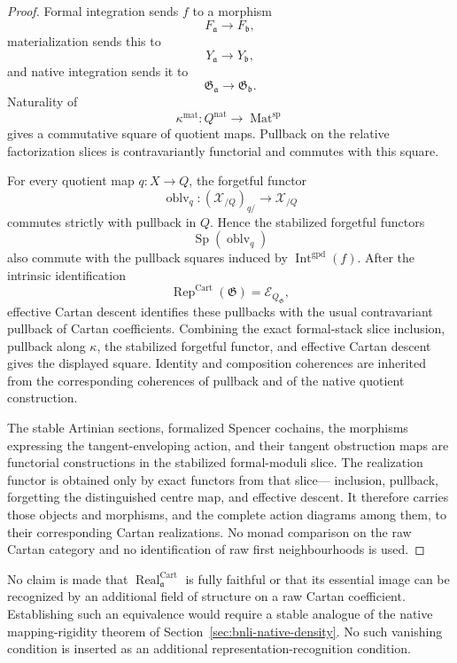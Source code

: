 \begin{proof}
Formal integration sends $f$ to a morphism
\[
    F_{\mathfrak a}\longrightarrow F_{\mathfrak b},
\]
materialization sends this to
\[
    Y_{\mathfrak a}\longrightarrow Y_{\mathfrak b},
\]
and native integration sends it to
\[
    \mathfrak G_{\mathfrak a}
    \longrightarrow
    \mathfrak G_{\mathfrak b}.
\]
Naturality of
\[
    \kappa^{\mathrm{mat}}:
    Q^{\mathrm{nat}}
    \longrightarrow
    \operatorname{Mat}^{\mathrm{sp}}
\]
gives a commutative square of quotient maps.  Pullback on the relative
factorization slices is contravariantly functorial and commutes with this
square.

For every quotient map $q:X\to Q$, the forgetful functor
\[
    \operatorname{oblv}_{q}:
    (\mathcal X_{/Q})_{q/}
    \longrightarrow
    \mathcal X_{/Q}
\]
commutes strictly with pullback in $Q$.  Hence the stabilized forgetful
functors
\[
    \operatorname{Sp}(\operatorname{oblv}_{q})
\]
also commute with the pullback squares induced by
$\operatorname{Int}^{\mathrm{gpd}}(f)$.  After the intrinsic identification
\[
    \operatorname{Rep}^{\mathrm{Cart}}(\mathfrak G)
    =
    \mathcal E_{Q_{\mathfrak G}},
\]
effective Cartan descent identifies these pullbacks with the usual
contravariant pullback of Cartan coefficients.  Combining the exact
formal-stack slice inclusion, pullback along $\kappa$, the stabilized
forgetful functor, and effective Cartan descent gives the displayed square.
Identity and composition coherences are inherited from the corresponding
coherences of pullback and of the native quotient construction.

The stable Artinian sections, formalized Spencer cochains, the morphisms
expressing the tangent-enveloping action, and their tangent obstruction maps
are functorial constructions in the stabilized formal-moduli slice.  The
realization functor is obtained only by exact functors from that slice---
inclusion, pullback, forgetting the distinguished centre map, and effective
descent.  It therefore carries those objects and morphisms, and the complete
action diagrams among them, to their corresponding Cartan realizations.  No
monad comparison on the raw Cartan category and no identification of raw first
neighbourhoods is used.
\end{proof}

\begin{remark}
No claim is made that
$\operatorname{Real}^{\mathrm{Cart}}_{\mathfrak a}$ is fully faithful or that
its essential image can be recognized by an additional field of structure on a
raw Cartan coefficient.  Establishing such an equivalence would require a
stable analogue of the native mapping-rigidity theorem of
Section~\ref{sec:bnli-native-density}.  No such vanishing condition is inserted
as an additional representation-recognition condition.
\end{remark}

